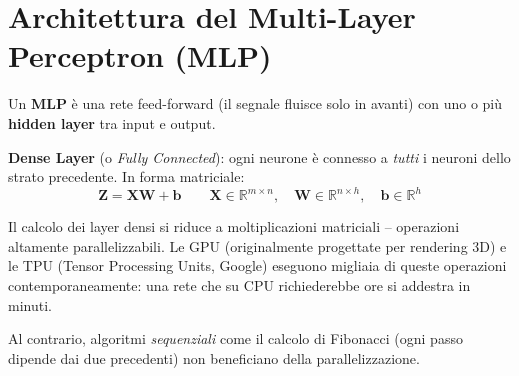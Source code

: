 \section{Architettura del Multi-Layer Perceptron (MLP)}

Un \textbf{MLP} è una rete feed-forward (il segnale fluisce solo in avanti) con uno o più \textbf{hidden layer} tra input e output.

\begin{center}
\end{center}

\textbf{Dense Layer} (o \emph{Fully Connected}): ogni neurone è connesso a \emph{tutti} i neuroni dello strato precedente. In forma matriciale:
\[
\mathbf{Z} = \mathbf{X} \mathbf{W} + \mathbf{b}
\qquad
\mathbf{X} \in \mathbb{R}^{m \times n}, \quad \mathbf{W} \in \mathbb{R}^{n \times h}, \quad \mathbf{b} \in \mathbb{R}^{h}
\]

\begin{notebox}
Il calcolo dei layer densi si riduce a moltiplicazioni matriciali -- operazioni altamente parallelizzabili. Le GPU (originalmente progettate per rendering 3D) e le TPU (Tensor Processing Units, Google) eseguono migliaia di queste operazioni contemporaneamente: una rete che su CPU richiederebbe ore si addestra in minuti.

Al contrario, algoritmi \emph{sequenziali} come il calcolo di Fibonacci (ogni passo dipende dai due precedenti) non beneficiano della parallelizzazione.
\end{notebox}

